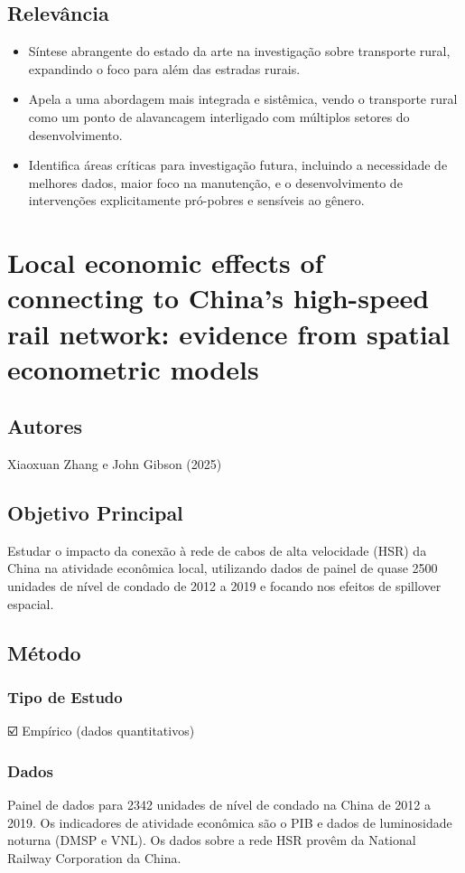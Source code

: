 \documentclass[12pt]{article}
\begin{document}
\subsection*{Relevância}
\begin{itemize}
    \item Síntese abrangente do estado da arte na investigação sobre transporte rural, expandindo o foco para além das estradas rurais.
    \item Apela a uma abordagem mais integrada e sistêmica, vendo o transporte rural como um ponto de alavancagem interligado com múltiplos setores do desenvolvimento.
    \item Identifica áreas críticas para investigação futura, incluindo a necessidade de melhores dados, maior foco na manutenção, e o desenvolvimento de intervenções explicitamente pró-pobres e sensíveis ao gênero.
\end{itemize}
\newpage

\section{Local economic effects of connecting to China's high-speed rail network: evidence from spatial econometric models}

\subsection*{Autores}
Xiaoxuan Zhang e John Gibson (2025)

\subsection*{Objetivo Principal}
Estudar o impacto da conexão à rede de cabos de alta velocidade (HSR) da China na atividade econômica local, utilizando dados de painel de quase 2500 unidades de nível de condado de 2012 a 2019 e focando nos efeitos de spillover espacial.

\subsection*{Método}

\subsubsection*{Tipo de Estudo}
☑️ Empírico (dados quantitativos)

\subsubsection*{Dados}
Painel de dados para 2342 unidades de nível de condado na China de 2012 a 2019. Os indicadores de atividade econômica são o PIB e dados de luminosidade noturna (DMSP e VNL). Os dados sobre a rede HSR provêm da National Railway Corporation da China.
\end{document}
